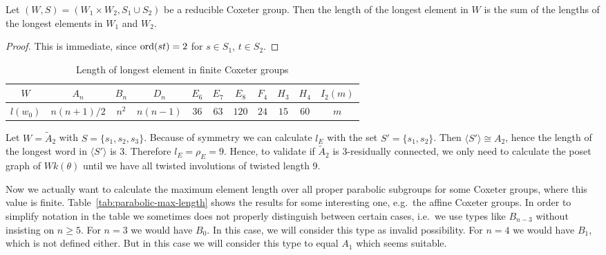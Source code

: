 \begin{prop}
	Let $(W,S) = (W_1 \times W_2, S_1 \cup S_2)$ be a reducible Coxeter group. Then the length of the longest element in $W$ is the sum of the lengths of the longest elements in $W_1$ and $W_2$.

	\begin{proof}
		This is immediate, since $\operatorname{ord}(st) = 2$ for $s \in S_1$, $t \in S_2$.
	\end{proof}
\end{prop}

\begin{table}[ht]
	\centering
	\begin{tabular}{|c|cccccccccc|}
		\hline
		$W$ & $A_n$ & $B_n$ & $D_n$ & $E_6$ & $E_7$ & $E_8$ & $F_4$ & $H_3$ & $H_4$ & $I_2(m)$ \\
		\hline
		$l(w_0)$ & $n(n+1)/2$ & $n^2$ & $n(n-1)$ & $36$ & $63$ & $120$ & $24$ & $15$ & $60$ & $m$ \\
		\hline
	\end{tabular}
	\caption{Length of longest element in finite Coxeter groups}
	\label{tab:length-w0}	
\end{table}

\begin{exam}
	Let $W = \tilde A_2$ with $S = \{s_1, s_2, s_3\}$. Because of symmetry we can calculate $l_E$ with the set $S' = \{s_1,s_2\}$. Then $\langle S' \rangle \cong A_2$, hence the length of the longest word in $\langle S' \rangle$ is $3$. Therefore $l_E = \rho_E = 9$. Hence, to validate if $\tilde A_2$ is 3-residually connected, we only need to calculate the poset graph of $Wk(\theta)$ until we have all twisted involutions of twisted length 9.
\end{exam}

Now we actually want to calculate the maximum element length over all proper parabolic subgroups for some Coxeter groups, where this value is finite. Table~\ref{tab:parabolic-max-length} shows the results for some interesting one, e.g.\ the affine Coxeter groups. In order to simplify notation in the table we sometimes does not properly distinguish between certain cases, i.e.\ we use types like $B_{n-3}$ without insisting on $n \geq 5$. For $n=3$ we would have $B_0$. In this case, we will consider this type as invalid possibility. For $n=4$ we would have $B_1$, which is not defined either. But in this case we will consider this type to equal $A_1$ which seems suitable.

